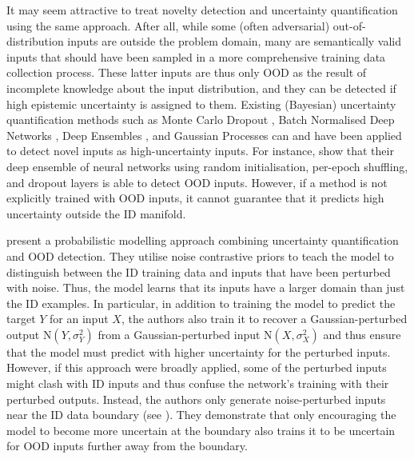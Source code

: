 It may seem attractive to treat novelty detection and uncertainty quantification using the same approach. After all, while some (often adversarial) out-of-distribution inputs are outside the problem domain, many are semantically valid inputs that should have been sampled in a more comprehensive training data collection process. These latter inputs are thus only OOD as the result of incomplete knowledge about the input distribution, and they can be detected if high epistemic uncertainty is assigned to them. Existing (Bayesian) uncertainty quantification methods such as Monte Carlo Dropout \cite{mc-dropout-2016}, Batch Normalised Deep Networks \cite{batch-normalized-uq-2018}, Deep Ensembles \cite{deep-ensembles-2017}, and Gaussian Processes \cite{gp-ml-2005} can and have been applied to detect novel inputs as high-uncertainty inputs. For instance, \textcite{ensemble-uncertainty-ood-2021} show that their deep ensemble of neural networks using random initialisation, per-epoch shuffling, and dropout layers is able to detect OOD inputs. However, if a method is not explicitly trained with OOD inputs, it cannot guarantee that it predicts high uncertainty outside the ID manifold.

\newpar \textcite{noise-contrastive-uq-2020} present a probabilistic modelling approach combining uncertainty quantification and OOD detection. They utilise noise contrastive priors to teach the model to distinguish between the ID training data and inputs that have been perturbed with noise. Thus, the model learns that its inputs have a larger domain than just the ID examples. In particular, in addition to training the model to predict the target $Y$ for an input $X$, the authors also train it to recover a Gaussian-perturbed output $\text{N}(Y, \sigma_{Y}^{2})$ from a Gaussian-perturbed input $\text{N}(X, \sigma_{X}^{2})$ and thus ensure that the model must predict with higher uncertainty for the perturbed inputs. However, if this approach were broadly applied, some of the perturbed inputs might clash with ID inputs and thus confuse the network's training with their perturbed outputs. Instead, the authors only generate noise-perturbed inputs near the ID data boundary (see ). They demonstrate that only encouraging the model to become more uncertain at the boundary also trains it to be uncertain for OOD inputs further away from the boundary.

